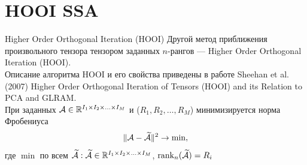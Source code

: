\documentclass[ucs, notheorems, handout]{beamer}
\begin{document}
    \section{HOOI SSA}
    \begin{frame}{Higher Order Orthogonal Iteration (HOOI)}
        Другой метод приближения произвольного тензора тензором заданных $n$-рангов --- Higher Order Orthogonal Iteration (HOOI).\\
        Описание алгоритма HOOI и его свойства приведены в работе Sheehan et al. (2007) Higher Order Orthogonal Iteration of Tensors (HOOI) and its Relation to PCA and GLRAM.\\
        При заданных $\mathcal{A} \in \mathbb{R}^{I_1 \times I_2 \times \ldots \times I_M}$ и ($R_1, R_2, \ldots, R_M$)
        минимизируется норма Фробениуса 
        \[
            \| \mathcal{A} - \widetilde{\mathcal{A}}\|^2 \to \min,
        \]
        где $\min$ по всем $\widetilde{\mathcal{A}}: \widetilde{\mathcal{A}} \in \mathbb{R}^{I_1 \times I_2 \times \ldots \times I_M}$, 
        $\operatorname{rank}_n(\widetilde{\mathcal{A}}) = R_i$
        
    \end{frame}
    
\end{document}
